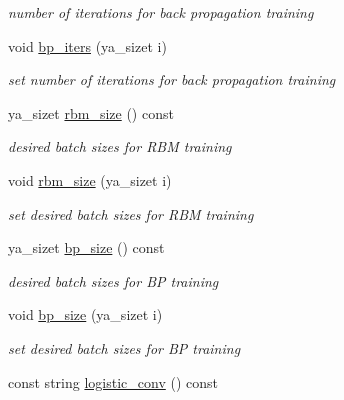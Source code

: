 \begin{CompactItemize}
\begin{CompactList}\small\item\em number of iterations for back propagation training \item\end{CompactList}\item 
\hypertarget{class_y_a_a_t_e_reduce_a21}{
void \hyperlink{class_y_a_a_t_e_reduce_a21}{bp\_\-iters} (ya\_\-sizet i)}
\label{class_y_a_a_t_e_reduce_a21}

\begin{CompactList}\small\item\em set number of iterations for back propagation training \item\end{CompactList}\item 
\hypertarget{class_y_a_a_t_e_reduce_a22}{
ya\_\-sizet \hyperlink{class_y_a_a_t_e_reduce_a22}{rbm\_\-size} () const }
\label{class_y_a_a_t_e_reduce_a22}

\begin{CompactList}\small\item\em desired batch sizes for RBM training \item\end{CompactList}\item 
\hypertarget{class_y_a_a_t_e_reduce_a23}{
void \hyperlink{class_y_a_a_t_e_reduce_a23}{rbm\_\-size} (ya\_\-sizet i)}
\label{class_y_a_a_t_e_reduce_a23}

\begin{CompactList}\small\item\em set desired batch sizes for RBM training \item\end{CompactList}\item 
\hypertarget{class_y_a_a_t_e_reduce_a24}{
ya\_\-sizet \hyperlink{class_y_a_a_t_e_reduce_a24}{bp\_\-size} () const }
\label{class_y_a_a_t_e_reduce_a24}

\begin{CompactList}\small\item\em desired batch sizes for BP training \item\end{CompactList}\item 
\hypertarget{class_y_a_a_t_e_reduce_a25}{
void \hyperlink{class_y_a_a_t_e_reduce_a25}{bp\_\-size} (ya\_\-sizet i)}
\label{class_y_a_a_t_e_reduce_a25}

\begin{CompactList}\small\item\em set desired batch sizes for BP training \item\end{CompactList}\item 
\hypertarget{class_y_a_a_t_e_reduce_a26}{
const string \hyperlink{class_y_a_a_t_e_reduce_a26}{logistic\_\-conv} () const }
\label{class_y_a_a_t_e_reduce_a26}


\end{CompactItemize}
